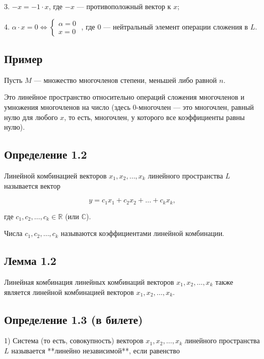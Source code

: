 {3. \( -x = -1 \cdot x \), где \( -x \) — противоположный вектор к \( x \);

4. \( \alpha \cdot x = 0 \iff 
\begin{cases} 
\alpha = 0 \\ 
x = 0 
\end{cases} \)
, где \( 0 \) — нейтральный элемент операции сложения в \( L \).

\subsection*{Пример}

Пусть \( M \) — множество многочленов степени, меньшей либо равной \( n \).

Это линейное пространство относительно операций сложения многочленов и умножения многочленов на число (здесь \( 0 \)-многочлен — это многочлен, равный нулю для любого \( x \), то есть, многочлен, у которого все коэффициенты равны нулю).

\subsection*{Определение 1.2}

Линейной комбинацией векторов \( x_1, x_2, \dots, x_k \) линейного пространства \( L \) называется вектор



\[
y = c_1 x_1 + c_2 x_2 + \dots + c_k x_k,
\]



где \( c_1, c_2, \dots, c_k \in \mathbb{R} \) (или \( \mathbb{C} \)).

Числа \( c_1, c_2, \dots, c_k \) называются коэффициентами линейной комбинации.

\subsection*{Лемма 1.2}

Линейная комбинация линейных комбинаций векторов \( x_1, x_2, \dots, x_k \) также является линейной комбинацией векторов \( x_1, x_2, \dots, x_k \).


\subsection*{Определение 1.3 (в билете)}

1) Система (то есть, совокупность) векторов \( x_1, x_2, \dots, x_k \) линейного пространства \( L \) называется **линейно независимой**, если равенство 



}
